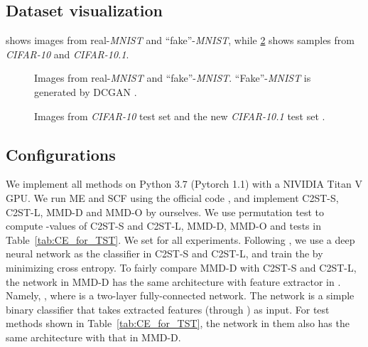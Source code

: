 \documentclass{article}
\begin{document}
\subsection{Dataset visualization}\label{Asec:data_visual}

 shows images from real-\emph{MNIST} and ``fake''-\emph{MNIST},
while \cref{fig:CIFAR10} shows samples from \emph{CIFAR-10} and \emph{CIFAR-10.1}.

\begin{figure}[ht]
    \begin{center}
        \caption{Images from real-\emph{MNIST} and ``fake''-\emph{MNIST}. ``Fake''-\emph{MNIST} is generated by DCGAN \citep{DCGAN_Radford}.}    \label{fig:MNIST}
    \end{center}
    \vspace{-0.5cm}
\end{figure}

\begin{figure}[!t]
    \begin{center}
        \caption{Images from \emph{CIFAR-10} test set and the new \emph{CIFAR-10.1} test set \citep{recht:imagenet}.}  \label{fig:CIFAR10}
    \end{center}
    \vspace{-0.5cm}
\end{figure}


\subsection{Configurations}\label{Asec:configuration}

We implement all methods on Python 3.7 (Pytorch 1.1) with a NIVIDIA Titan V GPU. We run ME and SCF using the official code \citep{Jitkrittum2016}, and implement C2ST-S, C2ST-L, MMD-D and MMD-O by ourselves. We use permutation test to compute -values of C2ST-S and C2ST-L, MMD-D, MMD-O and tests in Table~\ref{tab:CE_for_TST}. We set  for all experiments.  Following \citet{Lopez:C2ST}, we use a deep neural network  as the classifier in C2ST-S and C2ST-L, and train the  by minimizing cross entropy.
To fairly compare MMD-D with C2ST-S and C2ST-L, the network  in MMD-D has the same architecture with feature extractor in . Namely, , where  is a two-layer fully-connected network. The network  is a simple binary classifier that takes extracted features (through ) as input. For test methods shown in Table~\ref{tab:CE_for_TST}, the network  in them also has the same architecture with that in MMD-D.
\end{document}
